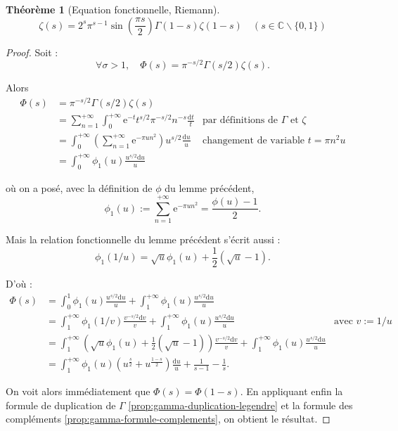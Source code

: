 \documentclass[french]{report}
\newtheorem{theorem}{Théorème}[section]
\begin{document}
\begin{theorem}[Equation fonctionnelle, Riemann]\label{thm:equation-fonctionnelle}
  \[ \zeta(s) = 2^s\pi^{s-1}\sin\left(\frac{\pi s}{2}\right)\Gamma(1-s)\zeta(1-s)\quad (s\in\mathbb{C}\backslash\{0,1\}) \]
\end{theorem}

\begin{proof}
  Soit :
  \[
    \forall\sigma>1,\quad
    \Phi(s)=\pi^{-s/2}\Gamma(s/2)\zeta(s).
  \]

  Alors
  \begin{align*}
    \Phi(s)
    &= \pi^{-s/2}\Gamma(s/2)\zeta(s) & \\
    &= \sum_{n=1}^{+\infty}\int_0^{+\infty}\mathrm{e}^{-t}t^{s/2}\pi^{-s/2}n^{-s}\frac{\mathrm{d}t}{t}
    & \text{par définitions de $\Gamma$ et $\zeta$} \\
    &= \int_0^{+\infty}\left(\sum_{n=1}^{+\infty}\mathrm{e}^{-\pi un^2}\right)u^{s/2}\frac{\mathrm{d}u}{u}
    & \text{changement de variable $t=\pi n^2u$} \\
    &= \int_0^{+\infty}\phi_1(u)\frac{u^{s/2}\mathrm{d}u}{u}
  \end{align*}

  où on a posé, avec la définition de $\phi$ du lemme précédent,
  \[
    \phi_1(u)
    :=\sum_{n=1}^{+\infty}\mathrm{e}^{-\pi un^2}
    = \frac{\phi(u)-1}{2}.
  \]

  Mais la relation fonctionnelle du lemme précédent s'écrit aussi :
  \[
    \phi_1(1/u)=\sqrt{u}\phi_1(u)+\frac{1}{2}(\sqrt{u}-1).
  \]

  D'où :
  \begin{align}
    \Phi(s)
    &= \int_0^1\phi_1(u)\frac{u^{s/2}\mathrm{d}u}{u} + \int_1^{+\infty}\phi_1(u)\frac{u^{s/2}\mathrm{d}u}{u}
    & \\
    &= \int_1^{+\infty}\phi_1(1/v)\frac{v^{-s/2}\mathrm{d}v}{v} + \int_1^{+\infty}\phi_1(u)\frac{u^{s/2}\mathrm{d}u}{u}
    & \text{avec $v:=1/u$} \\
    &= \int_1^{+\infty}\left(\sqrt{u}\phi_1(u)+\frac{1}{2}(\sqrt{u}-1)\right)\frac{v^{-s/2}\mathrm{d}v}{v} + \int_1^{+\infty}\phi_1(u)\frac{u^{s/2}\mathrm{d}u}{u}
    & \\
    &= \int_1^{+\infty}\phi_1(u)\left(u^{\frac{s}{2}}+u^{\frac{1-s}{2}}\right)\frac{\mathrm{d}u}{u} + \frac{1}{s-1}-\frac{1}{s}.\label{eq:phi-avec-phi-1}
  \end{align}

  On voit alors immédiatement que $\Phi(s)=\Phi(1-s)$. En appliquant enfin la formule de duplication de $\Gamma$ \ref{prop:gamma-duplication-legendre} et la formule des compléments \ref{prop:gamma-formule-complements}, on obtient le résultat.
\end{proof}
\end{document}
